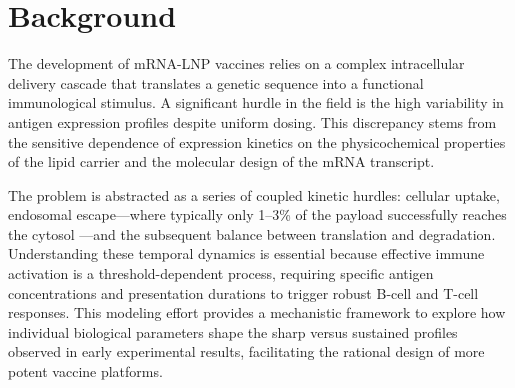 \section{Background}

The development of mRNA-LNP vaccines relies on a complex intracellular delivery cascade that translates a genetic sequence into a functional immunological stimulus. A significant hurdle in the field is the high variability in antigen expression profiles despite uniform dosing. This discrepancy stems from the sensitive dependence of expression kinetics on the physicochemical properties of the lipid carrier and the molecular design of the mRNA transcript. \parencite{pardi2015expressionKinetics}

The problem is abstracted as a series of coupled kinetic hurdles: cellular uptake, endosomal escape---where typically only 1--3\% of the payload successfully reaches the cytosol \parencite{Pei2025EndosomalEscapeLNP}---and the subsequent balance between translation and degradation. Understanding these temporal dynamics is essential because effective immune activation is a threshold-dependent process, requiring specific antigen concentrations and presentation durations to trigger robust B-cell and T-cell responses. This modeling effort provides a mechanistic framework to explore how individual biological parameters shape the sharp versus sustained profiles observed in early experimental results, facilitating the rational design of more potent vaccine platforms.